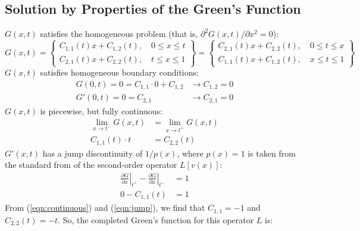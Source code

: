 \documentclass[10pt]{article}
\begin{document}
\subsection{Solution by Properties of the Green's Function}
$$\quad$$
$G(x,t)$ satisfies the homogeneous problem (that is, $\partial^2 G(x,t) / \partial x^2 = 0$):
\begin{equation}
    G(x,t) = 
    \left\{ \begin{matrix}
        C_{1,1}(t) x + C_{1,2}(t), \quad 0 \le x \le t \\ 
        C_{2,1}(t) x + C_{2,2}(t), \quad t \le x \le 1
    \end{matrix} \right\}
    =
    \left\{ \begin{matrix}
        C_{2,1}(t) x + C_{2,2}(t), \quad 0 \le t \le x \\ 
        C_{1,1}(t) x + C_{1,2}(t), \quad x \le t \le 1
    \end{matrix} \right\} 
\end{equation}
$G(x,t)$ satisfies homogeneous boundary conditions:
\begin{equation}
    \begin{split}
        G(0,t) = 0 = C_{1,1} \cdot 0 + C_{1,2}  &\xrightarrow{ } C_{1,2} = 0 \\
        G'(0,t) = 0 = C_{2,1} \quad \quad  &\xrightarrow{ } C_{2,1} = 0
    \end{split}
\end{equation}
$G(x,t)$ is piecewise, but fully continuous:
\begin{equation}
    \label{eqn:continuous}
    \begin{split}
        \lim _{ x \rightarrow t^- }{G(x,t)} &= \lim _{ x \rightarrow t^+ }{G(x,t)} \\
        C_{1,1}(t)\cdot t &= C_{2,2}(t)
    \end{split}
\end{equation}
$G'(x,t)$ has a jump discontinuity of $1/p(x)$, where $p(x)=1$ is taken from the standard from of the second-order operator $L[v(x)]$:
\begin{equation}
    \label{eqn:jump}
    \begin{split}
        \left. \frac{\partial G}{\partial x} \right| _{t^+} - \left. \frac{\partial G}{\partial x} \right| _{t^-} &= 1 \\
        0 - C_{1,1}(t) &= 1
    \end{split}
\end{equation}
From (\ref{eqn:continuous}) and (\ref{eqn:jump}), we find that $C_{1,1}=-1$ and $C_{2,2}(t)=-t$. So, the completed Green's function for this operator $L$ is:
\end{document}
